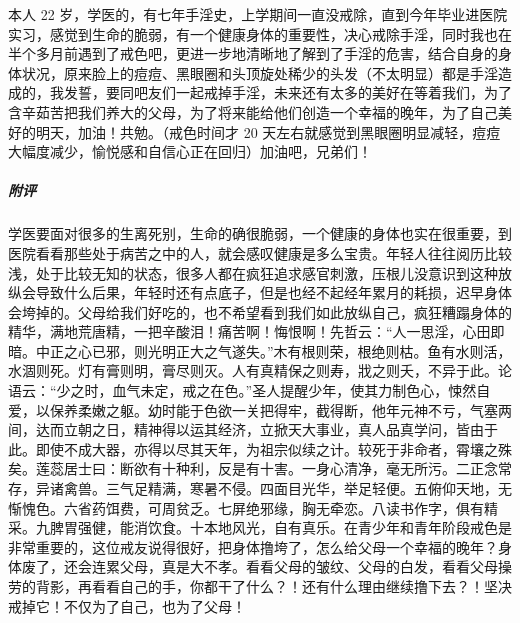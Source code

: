 \begin{case}
    本人 22 岁，学医的，有七年手淫史，上学期间一直没戒除，直到今年毕业进医院实习，感觉到生命的脆弱，有一个健康身体的重要性，决心戒除手淫，同时我也在半个多月前遇到了戒色吧，更进一步地清晰地了解到了手淫的危害，结合自身的身体状况，原来脸上的痘痘、黑眼圈和头顶旋处稀少的头发（不太明显）都是手淫造成的，我发誓，要同吧友们一起戒掉手淫，未来还有太多的美好在等着我们，为了含辛茹苦把我们养大的父母，为了将来能给他们创造一个幸福的晚年，为了自己美好的明天，加油！共勉。（戒色时间才 20 天左右就感觉到黑眼圈明显减轻，痘痘大幅度减少，愉悦感和自信心正在回归）加油吧，兄弟们！
    \subparagraph{附评} 学医要面对很多的生离死别，生命的确很脆弱，一个健康的身体也实在很重要，到医院看看那些处于病苦之中的人，就会感叹健康是多么宝贵。年轻人往往阅历比较浅，处于比较无知的状态，很多人都在疯狂追求感官刺激，压根儿没意识到这种放纵会导致什么后果，年轻时还有点底子，但是也经不起经年累月的耗损，迟早身体会垮掉的。父母给我们好吃的，也不希望看到我们如此放纵自己，疯狂糟蹋身体的精华，满地荒唐精，一把辛酸泪！痛苦啊！悔恨啊！先哲云：“人一思淫，心田即暗。中正之心已邪，则光明正大之气遂失。”木有根则荣，根绝则枯。鱼有水则活，水涸则死。灯有膏则明，膏尽则灭。人有真精保之则寿，戕之则夭，不异于此。论语云：“少之时，血气未定，戒之在色。”圣人提醒少年，使其力制色心，悚然自爱，以保养柔嫩之躯。幼时能于色欲一关把得牢，截得断，他年元神不亏，气塞两间，达而立朝之日，精神得以运其经济，立掀天大事业，真人品真学问，皆由于此。即使不成大器，亦得以尽其天年，为祖宗似续之计。较死于非命者，霄壤之殊矣。莲蕊居士曰：断欲有十种利，反是有十害。一身心清净，毫无所污。二正念常存，异诸禽兽。三气足精满，寒暑不侵。四面目光华，举足轻便。五俯仰天地，无惭愧色。六省药饵费，可周贫乏。七屏绝邪缘，胸无牵恋。八读书作字，俱有精采。九脾胃强健，能消饮食。十本地风光，自有真乐。在青少年和青年阶段戒色是非常重要的，这位戒友说得很好，把身体撸垮了，怎么给父母一个幸福的晚年？身体废了，还会连累父母，真是大不孝。看看父母的皱纹、父母的白发，看看父母操劳的背影，再看看自己的手，你都干了什么？！还有什么理由继续撸下去？！坚决戒掉它！不仅为了自己，也为了父母！
\end{case}

